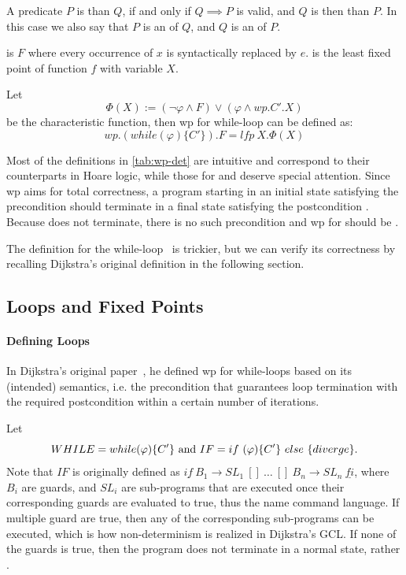 A predicate $P$ is  than $Q$, if and only if $Q\implies P$ is valid, and $Q$ is then  than $P$. 
In this case we also say that $P$ is an  of $Q$, and $Q$ is an  of $P$. 

 is $F$ where every occurrence of $x$ is syntactically replaced by $e$. 
 is the least fixed point of function $f$ with variable $X$. 

Let {$$\Phi(X):=(\neg\varphi\wedge F)\vee(\varphi\wedge wp.C'.X)$$} be the characteristic function, then wp for while-loop can be defined as: 
{$$wp.(while(\varphi)\{C'\}).F = lfp\ X. \Phi(X)$$}

Most of the definitions in \autoref{tab:wp-det} are intuitive and correspond to their counterparts in Hoare logic, while those for  and  deserve special attention. 
Since wp aims for total correctness, a program starting in an initial state satisfying the precondition  should terminate in a final state satisfying the postcondition . 
Because  does not terminate, there is no such precondition and wp for  should be . 

The definition for the while-loop~\cite{kaminski19} is trickier, but we can verify its correctness by recalling Dijkstra's original definition in the following section. 


\subsection{Loops and Fixed Points}\label{sec:define loops}
\paragraph{Defining Loops}
In Dijkstra's original paper~\cite{dijkstra75}, he defined wp for while-loops based on its (intended) semantics, i.e. the precondition that guarantees loop termination with the required postcondition within a certain number of iterations. 

Let 
\[
WHILE=while(\varphi)\{C'\}
\\\text{ and } \\ 
IF=  if\ (\varphi)\{C'\}\ else\ \{diverge\}. 
\] 
Note that $IF$ is originally defined as $\underline{if}\ B_1 \to SL_1 \ []\ \dots\ []\ B_n\to SL_n\ \underline{fi}$, where $B_i$ are guards, and $SL_i$ are sub-programs that are executed once their corresponding guards are evaluated to true, thus the name  command language.
If multiple guard are true, then any of the corresponding sub-programs can be executed, which is how non-determinism is realized in Dijkstra's GCL. 
If none of the guards is true, then the program does not terminate in a normal state, rather . 

